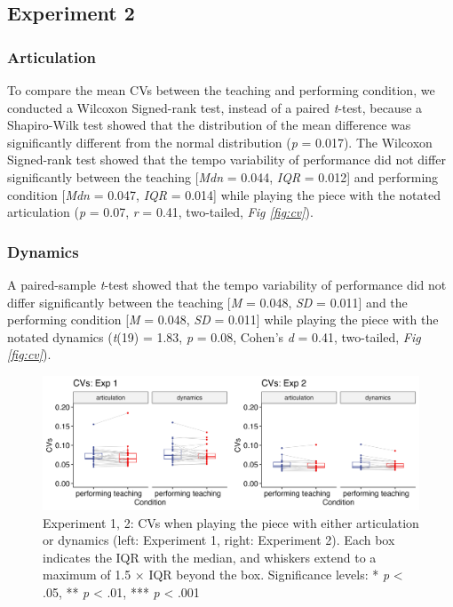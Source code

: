 \documentclass[
  man,floatsintext]{apa6}
\begin{document}
\hypertarget{experiment-2-2}{%
\subsection{Experiment 2}\label{experiment-2-2}}

\hypertarget{articulation-3}{%
\subsubsection{Articulation}\label{articulation-3}}

To compare the mean CVs between the teaching and performing condition, we conducted a Wilcoxon Signed-rank test, instead of a paired \emph{t}-test, because a Shapiro-Wilk test showed that the distribution of the mean difference was significantly different from the normal distribution (\emph{p} = 0.017). The Wilcoxon Signed-rank test showed that the tempo variability of performance did not differ significantly between the teaching {[}\emph{Mdn} = 0.044, \emph{IQR} = 0.012{]} and performing condition {[}\emph{Mdn} = 0.047, \emph{IQR} = 0.014{]} while playing the piece with the notated articulation (\emph{p} = 0.07, \emph{r} = 0.41, two-tailed, \emph{Fig \ref{fig:cv}}).

\hypertarget{dynamics-3}{%
\subsubsection{Dynamics}\label{dynamics-3}}

A paired-sample \emph{t}-test showed that the tempo variability of performance did not differ significantly between the teaching {[}\emph{M} = 0.048, \emph{SD} = 0.011{]} and the performing condition {[}\emph{M} = 0.048, \emph{SD} = 0.011{]} while playing the piece with the notated dynamics (\emph{t}(19) = 1.83, \emph{p} = 0.08, Cohen's \emph{d} = 0.41, two-tailed, \emph{Fig \ref{fig:cv}}).

\begin{figure}
\includegraphics[width=1\linewidth]{manuscript_files/figure-latex/plot-cv-1} \caption{\label{fig:cv}Experiment 1, 2: CVs when playing the piece with either articulation or dynamics (left: Experiment 1, right: Experiment 2). Each box indicates the IQR with the median, and whiskers extend to a maximum of 1.5 × IQR beyond the box. Significance levels: * \textit{p} < .05, ** \textit{p} < .01, *** \textit{p} < .001}\label{fig:plot-cv}
\end{figure}
\end{document}
